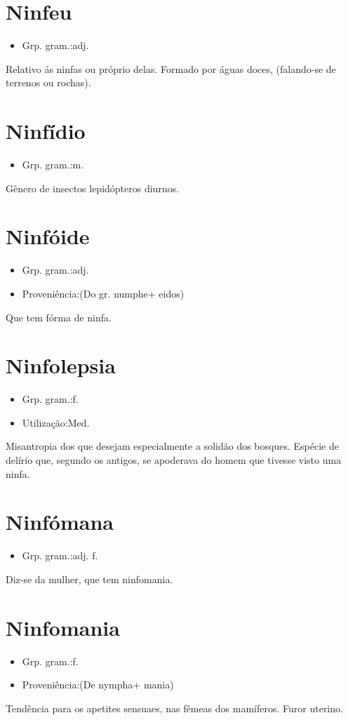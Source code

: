 \section{Ninfeu}
\begin{itemize}
\item {Grp. gram.:adj.}
\end{itemize}
Relativo ás ninfas ou próprio delas.
Formado por águas doces, (falando-se de terrenos ou rochas).
\section{Ninfídio}
\begin{itemize}
\item {Grp. gram.:m.}
\end{itemize}
Gênero de insectos lepidópteros diurnos.
\section{Ninfóide}
\begin{itemize}
\item {Grp. gram.:adj.}
\end{itemize}
\begin{itemize}
\item {Proveniência:(Do gr. \textunderscore numphe\textunderscore  + \textunderscore eidos\textunderscore )}
\end{itemize}
Que tem fórma de ninfa.
\section{Ninfolepsia}
\begin{itemize}
\item {Grp. gram.:f.}
\end{itemize}
\begin{itemize}
\item {Utilização:Med.}
\end{itemize}
Misantropia dos que desejam especialmente a solidão dos bosques.
Espécie de delírio que, segundo os antigos, se apoderava do homem que tivesse visto uma ninfa.
\section{Ninfómana}
\begin{itemize}
\item {Grp. gram.:adj. f.}
\end{itemize}
Diz-se da mulher, que tem ninfomania.
\section{Ninfomania}
\begin{itemize}
\item {Grp. gram.:f.}
\end{itemize}
\begin{itemize}
\item {Proveniência:(De \textunderscore nympha\textunderscore  + \textunderscore mania\textunderscore )}
\end{itemize}
Tendência para os apetites sensuaes, nas fêmeas dos mamíferos.
Furor uterino.
